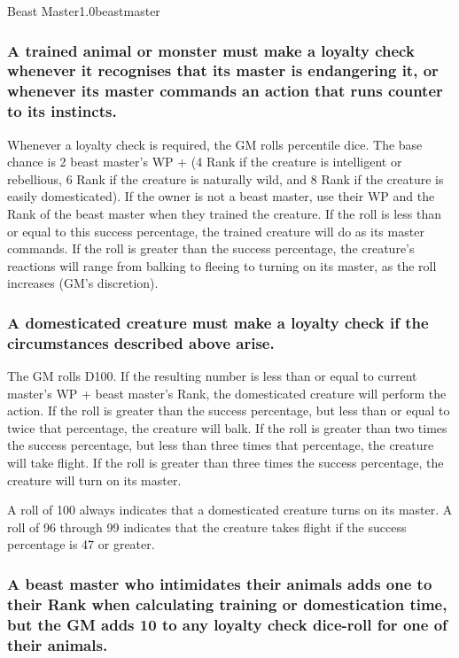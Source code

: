 \begin{skill}{Beast Master}{1.0}{beastmaster}
\subsubsection{A trained animal or monster must make a loyalty check
whenever it recognises that its master is endangering it, or whenever
its master commands an action that runs counter to its instincts.}
\label{beastmaster:loyality}

Whenever a loyalty check is required, the GM rolls percentile dice.
The base chance is 2 \x beast master's WP + (4 \x Rank if the creature
is intelligent or rebellious, 6 \x Rank if the creature is naturally
wild, and 8 \x Rank if the creature is easily domesticated).  If the
owner is not a beast master, use their WP and the Rank of the beast
master when they trained the creature.  If the roll is less than or
equal to this success percentage, the trained creature will do as its
master commands. If the roll is greater than the success percentage,
the creature's reactions will range from balking to fleeing to turning
on its master, as the roll increases (GM's discretion).

\subsubsection{A domesticated creature must make a loyalty check if
the circumstances described above arise.}

The GM rolls D100.  If the resulting number is less than or equal to
current master's WP + beast master's Rank, the domesticated creature
will perform the action.  If the roll is greater than the success
percentage, but less than or equal to twice that percentage, the
creature will balk.  If the roll is greater than two times the success
percentage, but less than three times that percentage, the creature
will take flight.  If the roll is greater than three times the success
percentage, the creature will turn on its master.

A roll of 100 always indicates that a domesticated creature turns on
its master.  A roll of 96 through 99 indicates that the creature takes
flight if the success percentage is 47 or greater.

\subsubsection{A beast master who intimidates their animals adds one to
their Rank when calculating training or domestication time, but the GM
adds 10 to any loyalty check dice-roll for one of their animals.}


\end{skill}
